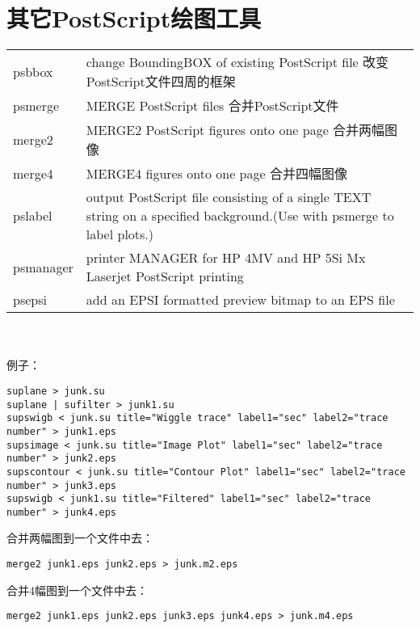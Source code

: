\section{其它PostScript绘图工具}
\begin{tabular}{lp{}}
	\toprule
	psbbox & change BoundingBOX of existing PostScript file 改变PostScript文件四周的框架\\
	psmerge & MERGE PostScript files 合并PostScript文件\\
	merge2 & MERGE2 PostScript figures onto one page 合并两幅图像\\
	merge4 & MERGE4 figures onto one page 合并四幅图像\\
	pslabel & output PostScript file consisting of a single TEXT string on a specified background.(Use with psmerge to label plots.) \\
	psmanager & printer MANAGER for HP 4MV and HP 5Si Mx Laserjet PostScript printing\\
	psepsi & add an EPSI formatted preview bitmap to an EPS file\\
	\bottomrule
\end{tabular}\\\\
例子：
\begin{lstlisting}
suplane > junk.su
suplane | sufilter > junk1.su
supswigb < junk.su title="Wiggle trace" label1="sec" label2="trace number" > junk1.eps
supsimage < junk.su title="Image Plot" label1="sec" label2="trace number" > junk2.eps
supscontour < junk.su title="Contour Plot" label1="sec" label2="trace number" > junk3.eps
supswigb < junk1.su title="Filtered" label1="sec" label2="trace number" > junk4.eps
\end{lstlisting}
合并两幅图到一个文件中去：
\begin{lstlisting}
merge2 junk1.eps junk2.eps > junk.m2.eps
\end{lstlisting}
合并4幅图到一个文件中去：
\begin{lstlisting}
merge2 junk1.eps junk2.eps junk3.eps junk4.eps > junk.m4.eps
\end{lstlisting}